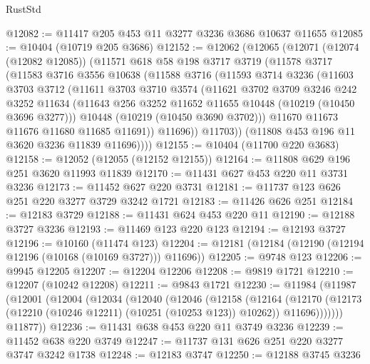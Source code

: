 \begin{lexlean}{RustStd}
\begin{coremodule}
@12082 := @11417 @205 @453 @11 @3277 @3236 @3686 @10637 @11655
@12085 := @10404 (@10719 @205 @3686)
@12152 := @12062
    (@12065
      (@12071
        (@12074 (@12082 @12085))
        (@11571
          @618
          @58
          @198
          @3717
          @3719
          (@11578
            @3717
            (@11583
              @3716
              @3556
              @10638
              (@11588
                @3716
                (@11593
                  @3714
                  @3236
                  (@11603
                    @3703
                    @3712
                    (@11611
                      @3703
                      @3710
                      @3574
                      (@11621
                        @3702
                        @3709
                        @3246
                        @242
                        @3252
                        @11634
                        (@11643 @256 @3252 @11652 @11655 @10448 (@10219 (@10450 @3696 @3277)))
                        @10448
                        (@10219 (@10450 @3690 @3702)))
                      @11670
                      @11673
                      @11676
                      @11680
                      @11685
                      @11691))
                  @11696))
              @11703))
          (@11808 @453 @196 @11 @3620 @3236 @11839 @11696))))
@12155 := @10404 (@11700 @220 @3683)
@12158 := @12052 (@12055 (@12152 @12155))
@12164 := @11808 @629 @196 @251 @3620 @11993 @11839
@12170 := @11431 @627 @453 @220 @11 @3731 @3236
@12173 := @11452 @627 @220 @3731
@12181 := @11737 @123 @626 @251 @220 @3277 @3729 @3242 @1721
@12183 := @11426 @626 @251
@12184 := @12183 @3729
@12188 := @11431 @624 @453 @220 @11
@12190 := @12188 @3727 @3236
@12193 := @11469 @123 @220 @123
@12194 := @12193 @3727
@12196 := @10160 (@11474 @123)
@12204 := @12181 (@12184 (@12190 (@12194 @12196 (@10168 (@10169 @3727))) @11696))
@12205 := @9748 @123
@12206 := @9945 @12205
@12207 := @12204 @12206
@12208 := @9819 @1721
@12210 := @12207 (@10242 @12208)
@12211 := @9843 @1721
@12230 := @11984
    (@11987
      (@12001
        (@12004
          (@12034
            (@12040
              (@12046
                (@12158
                  (@12164
                    (@12170
                      (@12173 (@12210 (@10246 @12211) (@10251 (@10253 @123)) @10262))
                      @11696)))))))
        @11877))
@12236 := @11431 @638 @453 @220 @11 @3749 @3236
@12239 := @11452 @638 @220 @3749
@12247 := @11737 @131 @626 @251 @220 @3277 @3747 @3242 @1738
@12248 := @12183 @3747
@12250 := @12188 @3745 @3236

\end{coremodule}
\end{lexlean}
